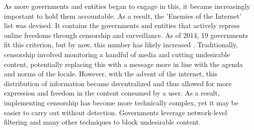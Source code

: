 As more governments and entities began to engage in this, it became increasingly important to hold them accountable. As a result, the 'Enemies of the Internet' list was devised. It contains the governments and entities that actively repress online freedoms through censorship and surveillance. As of 2014, 19 governments fit this criterion, but by now, this number has likely increased \cite{GlobalCensorshipRef2}. Traditionally, censorship involved monitoring a handful of media and cutting undesirable content, potentially replacing this with a message more in line with the agenda and norms of the locale. However, with the advent of the internet, this distribution of information became decentralized and thus allowed for more expression and freedom in the content consumed by a user. As a result, implementing censorship has become more technically complex, yet it may be easier to carry out without detection. Governments leverage network-level filtering and many other techniques to block undesirable content.


